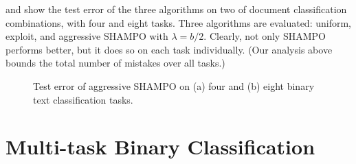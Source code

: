   and  show the test error of the three algorithms on two of document 
classification combinations, with four and eight tasks. Three algorithms are evaluated: uniform, exploit, and 
aggressive SHAMPO with $\lambda=b/2$. Clearly, not only SHAMPO performs better, 
but it does so on each task individually. (Our analysis above bounds the total number of mistakes over all 
tasks.)
 
  \begin{figure}[h]
\begin{centering}
 \caption{
 Test error of aggressive SHAMPO on (a) four and (b) eight binary text classification tasks.}
\end{centering}
\end{figure}

\section{Multi-task Binary Classification}

